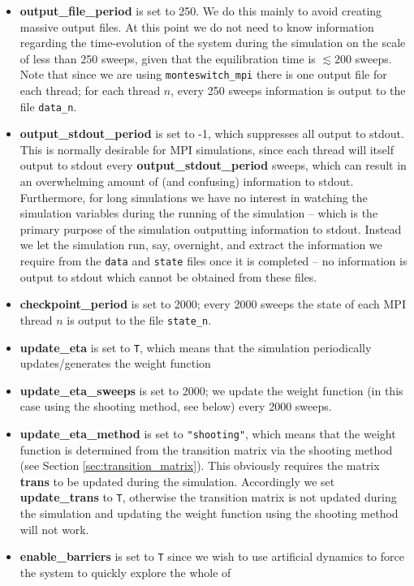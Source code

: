 \documentclass{report}
\begin{document}
\begin{itemize}
\item \textbf{output\_file\_period} is set to 250. We do this mainly to avoid creating massive output files. At this point we do not need to know 
  information regarding the time-evolution of the system during the simulation on the scale of less than 250 sweeps, given that the equilibration time is
  $\lesssim 200$ sweeps. Note that since we are using \texttt{monteswitch\_mpi} there is one output file for each thread; for each thread $n$, every 
  250 sweeps information is output to the file \texttt{data\_n}.
\item \textbf{output\_stdout\_period} is set to -1, which suppresses all output to stdout. This is normally desirable for MPI simulations, since each thread 
  will itself output to stdout every \textbf{output\_stdout\_period} sweeps, which can result in an overwhelming amount of (and confusing) information to 
  stdout. 
  Furthermore, for long simulations we have no interest in watching the simulation variables during the running of the simulation -- which is the primary
  purpose of the simulation outputting information to stdout. Instead we let the simulation run, say, overnight, and extract the information we require
  from the \texttt{data} and \texttt{state} files once it is completed -- no information is output to stdout which cannot be obtained from these files.
\item \textbf{checkpoint\_period} is set to 2000; every 2000 sweeps the state of each MPI thread $n$ is output to the file \texttt{state\_n}.
\item \textbf{update\_eta} is set to \texttt{T}, which means that the simulation periodically updates/generates the weight function
\item \textbf{update\_eta\_sweeps} is set to 2000; we update the weight function (in this case using the shooting method, see below) every 2000 
  sweeps.
\item \textbf{update\_eta\_method} is set to \verb|"shooting"|, which means that the weight function is determined from the transition matrix via the 
  shooting method (see Section \ref{sec:transition_matrix}). This obviously requires the matrix \textbf{trans} to be updated during the simulation. 
  Accordingly we set \textbf{update\_trans} to \texttt{T}, otherwise
  the transition matrix is not updated during the simulation and updating the weight function using the shooting method will not work.
\item \textbf{enable\_barriers} is set to \texttt{T} since we wish to use artificial dynamics to force the system to quickly explore the whole of

\end{itemize}
\end{document}
